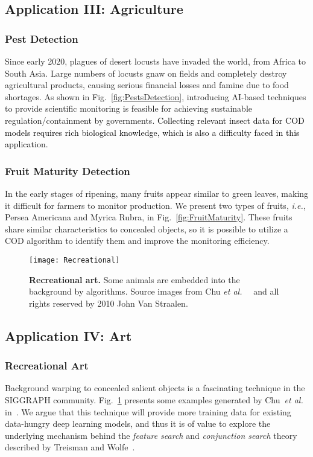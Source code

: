 \documentclass[10pt,journal,compsoc]{IEEEtran}
\def\ie{\emph{i.e.}}
\def\etal{{\em et al.~}}
\newcommand{\figref}[1]{Fig.~\ref{#1}}
\newcommand{\Rev}[1]{\textcolor{black}{#1}}
\begin{document}
\subsection{Application III: Agriculture}
\subsubsection{Pest Detection}
Since early 2020, plagues of desert locusts have invaded the world, 
from Africa to South Asia. Large numbers of locusts gnaw on fields and 
completely destroy agricultural products, 
causing serious financial losses and famine due to food shortages. 
As shown in \figref{fig:PestsDetection}, 
introducing AI-based techniques to provide scientific monitoring is 
feasible for achieving sustainable regulation/containment by governments.
\Rev{Collecting relevant insect data for COD models requires rich biological knowledge, which is also a difficulty faced in this application.}

\subsubsection{Fruit Maturity Detection}
In the early stages of ripening, many fruits appear similar to green leaves,
making it difficult for farmers to monitor production. 
We present two types of fruits, \ie, Persea Americana and Myrica Rubra, 
in \figref{fig:FruitMaturity}. These fruits share similar characteristics 
to concealed objects, so it is possible to utilize a COD algorithm 
to identify them and improve the monitoring efficiency.

\begin{figure}[t!]
  \centering
  \texttt{[image: Recreational]} \\
  \vspace{-12pt}
  \caption{\textbf{Recreational art.}
	Some animals are embedded into the background by algorithms. 
    Source images from Chu \etal~\cite{chu2010camouflage} 
    and all rights reserved by 2010 John Van Straalen. 
  }\label{fig:Recreational}
\end{figure}

\subsection{Application IV: Art}
\subsubsection{Recreational Art}
Background warping to concealed salient objects is a fascinating technique 
in the SIGGRAPH community. 
\figref{fig:Recreational} presents some examples generated by Chu~\etal 
in~\cite{chu2010camouflage}. We argue that this technique will provide more 
training data for existing data-hungry deep learning models, 
and thus it is of value to explore the \Rev{underlying} mechanism behind the 
\textit{feature search} and \textit{conjunction search} theory described 
by Treisman and Wolfe~\cite{treisman1988features,wolfe1994guided}.
\end{document}
